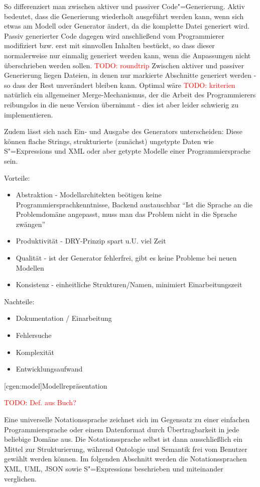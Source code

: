 \documentclass[a4paper, bibgerm]{book}
\newcommand{\todo}[1]{
  \textcolor{red}{TODO: #1}
}
\newcommand\lsection{}
\newcommand{\sexps}{S"=Expressions}
\newcommand{\cgen}{Code"=Generierung}
\begin{document}
So differenziert man zwischen aktiver und passiver
\cgen{}. Aktiv bedeutet, dass die Generierung wiederholt
ausgeführt werden kann, wenn sich etwas am Modell oder Generator
ändert, da die komplette Datei generiert wird. Passiv generierter Code
dagegen wird anschließend vom Programmierer modifiziert bzw. erst mit
sinnvollen Inhalten bestückt, so dass dieser normalerweise nur
einmalig generiert werden kann, wenn die Anpassungen nicht
überschrieben werden sollen. \todo{roundtrip} Zwischen aktiver und
passiver Generierung liegen Dateien, in denen nur markierte Abschnitte
generiert werden - so dass der Rest unverändert bleiben kann. Optimal
wäre \todo{kriterien} natürlich ein allgemeiner Merge-Mechanismus, der die Arbeit des
Programmierers reibungslos in die neue Version übernimmt - dies ist
aber leider schwierig zu implementieren.

Zudem lässt sich nach Ein- und Ausgabe des Generators unterscheiden:
Diese können flache Strings, strukturierte (zunächst) ungetypte Daten wie \sexps{}
und XML oder aber getypte Modelle einer Programmiersprache sein.

Vorteile:
\begin{itemize}
\item Abstraktion - Modellarchitekten beötigen keine
  Programmiersprachkenntnisse, Backend austauschbar
``Ist die Sprache an die Problemdomäne angepasst, muss man das Problem
nicht in die Sprache zwängen''
\item Produktivität - DRY-Prinzip spart u.U. viel Zeit
\item Qualität - ist der Generator fehlerfrei, gibt es keine Probleme
  bei neuen Modellen
\item Konsistenz - einheitliche Strukturen/Namen, minimiert Einarbeitungszeit
\end{itemize}

Nachteile:
\begin{itemize}
\item Dokumentation / Einarbeitung
\item Fehlersuche
\item Komplexität
\item Entwicklungsaufwand
\end{itemize}

\lsection[cgen:model]{Modellrepräsentation}

\todo{Def. aus Buch?}

Eine universelle Notationssprache zeichnet sich im Gegensatz zu einer
einfachen Programmiersprache oder einem Datenformat durch
Übertragbarkeit in jede beliebige Domäne aus. Die Notationssprache
selbst ist dann ausschließlich ein Mittel zur Strukturierung, während
Ontologie und Semantik frei vom Benutzer gewählt werden können. Im
folgenden Abschnitt werden die Notationssprachen XML, UML, JSON sowie
\sexps{} beschrieben und miteinander verglichen.
\end{document}
